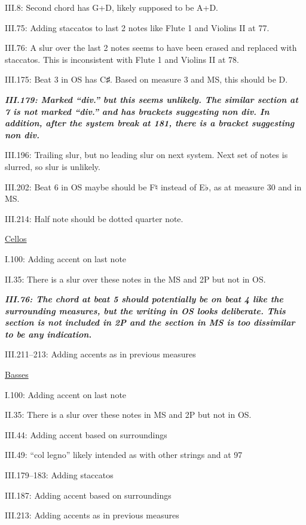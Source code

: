 \documentclass[twoside]{article}
\begin{document}
\begin{hangparas}{15pt}{1}
\begin{multicols}{2}
III.8: Second chord has G+D, likely supposed to be A+D.

III.75: Adding staccatos to last 2 notes like Flute 1 and Violins II at 77.

III.76: A slur over the last 2 notes seems to have been erased and replaced with staccatos. This is inconsistent with Flute 1 and Violins II at 78.

III.175: Beat 3 in OS has C♯. Based on measure 3 and MS, this should be D.

\textbf{\textit{III.179: Marked ``div.'' but this seems unlikely. The similar section at 7 is not marked ``div.'' and has brackets suggesting non div. In addition, after the system break at 181, there is a bracket suggesting non div.}}

III.196: Trailing slur, but no leading slur on next system. Next set of notes is slurred, so slur is unlikely.

III.202: Beat 6 in OS maybe should be F♮ instead of E♭, as at measure 30 and in MS.

III.214: Half note should be dotted quarter note.

\underline{Cellos}

I.100: Adding accent on last note

II.35: There is a slur over these notes in the MS and 2P but not in OS.

\textbf{\textit{III.76: The chord at beat 5 should potentially be on beat 4 like the surrounding measures, but the writing in OS looks deliberate. This section is not included in 2P and the section in MS is too dissimilar to be any indication.}}

III.211--213: Adding accents as in previous measures

\underline{Basses}

I.100: Adding accent on last note

II.35: There is a slur over these notes in MS and 2P but not in OS.

III.44: Adding accent based on surroundings

III.49: ``col legno'' likely intended as with other strings and at 97

III.179--183: Adding staccatos

III.187: Adding accent based on surroundings

III.213: Adding accents as in previous measures

\end{multicols}

\end{hangparas}
\end{document}
